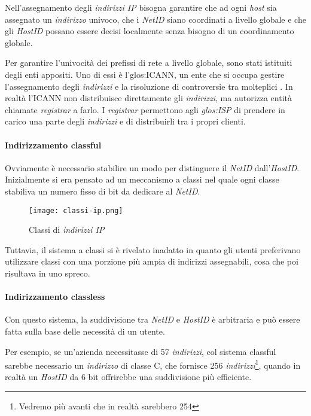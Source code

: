 \begin{note}
    Nell'assegnamento degli \emph{indirizzi IP} bisogna garantire che ad ogni
    \emph{host} sia assegnato un \emph{indirizzo} univoco, che i \emph{NetID}
    siano coordinati a livello globale e che gli \emph{HostID} possano essere
    decisi localmente senza bisogno di un coordinamento globale.
\end{note}\noindent
Per garantire l'univocità dei prefissi di rete a livello globale, sono
stati istituiti degli enti appositi. Uno di essi è l'\gls{glos:ICANN}, un ente
che si occupa gestire l'assegnamento degli \emph{indirizzi} e la risoluzione di
controversie tra molteplici . In realtà l'ICANN non distribuisce
direttamente gli \emph{indirizzi}, ma autorizza entità chiamate \emph{registrar}
a farlo. I \emph{registrar} permettono agli \emph{\gls{glos:ISP}} di
prendere in carico una parte degli \emph{indirizzi} e di distribuirli tra i
propri clienti.

\paragraph{Indirizzamento classful}
Ovviamente è necessario stabilire un modo per distinguere il \emph{NetID}
dall'\emph{HostID}. Inizialmente si era pensato ad un meccanismo a classi nel
quale ogni classe stabiliva un numero fisso di bit da dedicare al \emph{NetID}.

\begin{figure}[h!]
    \centering
    \texttt{[image: classi-ip.png]}
    \caption{Classi di \emph{indirizzi IP}}
\end{figure}\noindent
Tuttavia, il sistema a classi si è rivelato inadatto in quanto gli utenti
preferivano utilizzare classi con una porzione più ampia di indirizzi
assegnabili, cosa che poi risultava in uno spreco.

\paragraph{Indirizzamento classless}
Con questo sistema, la suddivisione tra \emph{NetID} e \emph{HostID} è
arbitraria e può essere fatta sulla base delle necessità di un utente.

Per esempio, se un'azienda necessitasse di 57 \emph{indirizzi}, col sistema
classful sarebbe necessario un \emph{indirizzo} di classe C, che fornisce 256
\emph{indirizzi}\footnote{Vedremo più avanti che in realtà sarebbero 254},
quando in realtà un \emph{HostID} da 6 bit offrirebbe una suddivisione più
efficiente.

